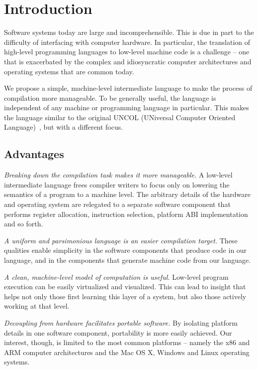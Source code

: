 \section{Introduction}

Software systems today are large and incomprehensible.
This is due in part to the difficulty
of interfacing with computer hardware.
In particular, the translation of high-level programming
languages to low-level machine code
is a challenge -- one that is exacerbated by
the complex and idiosyncratic
computer architectures and operating systems that are common today.

We propose a simple, machine-level intermediate language to make
the process of compilation more manageable.
To be generally useful, the language is independent of any
machine or programming language in particular.
This makes the language similar to the original
UNCOL (UNiversal Computer Oriented Language)~\cite{strong1958problem},
but with a different focus.

\subsection{Advantages}

\emph{Breaking down the compilation task makes it more manageable.}
A low-level intermediate language frees compiler writers
to focus only on lowering the semantics of a program to a machine level.
The arbitrary details of the hardware and operating system
are relegated to a separate software component that performs
register allocation, instruction selection, platform ABI implementation and so forth.

\emph{A uniform and parsimonious language is an easier compilation target.}
These qualities enable simplicity in the software components that
produce code in our language, and in the components that %
generate machine code from our language.

\emph{A clean, machine-level model of computation is useful.}
Low-level program execution can be easily virtualized and visualized.
This can lead to insight that helps not only those first learning
this layer of a system, but also those actively working at that level.

\emph{Decoupling from hardware facilitates portable software.}
By isolating platform details in one software component,
portability is more easily achieved.
Our interest, though, is limited to the most common platforms -- namely
the x86 and ARM computer architectures and the Mac OS X, Windows and
Linux operating systems.

